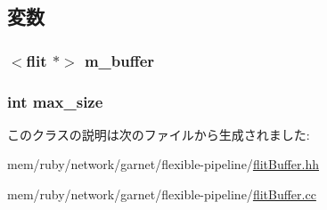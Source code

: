 \subsection{変数}
\hypertarget{classflitBuffer_a7a3921685941f05d65ce9ec45a63f6d1}{
\subsubsection[{m\_\-buffer}]{$<${\bf flit} $\ast$$>$ {\bf m\_\-buffer}}}
\label{classflitBuffer_a7a3921685941f05d65ce9ec45a63f6d1}
\hypertarget{classflitBuffer_a98ca8117bc73d9d7520727c4ce8772e6}{
\subsubsection[{max\_\-size}]{\setlength{\rightskip}{0pt plus 5cm}int {\bf max\_\-size}}}
\label{classflitBuffer_a98ca8117bc73d9d7520727c4ce8772e6}


このクラスの説明は次のファイルから生成されました:\begin{DoxyCompactItemize}
\item 
mem/ruby/network/garnet/flexible-\/pipeline/\hyperlink{flitBuffer_8hh}{flitBuffer.hh}\item 
mem/ruby/network/garnet/flexible-\/pipeline/\hyperlink{flitBuffer_8cc}{flitBuffer.cc}\end{DoxyCompactItemize}
